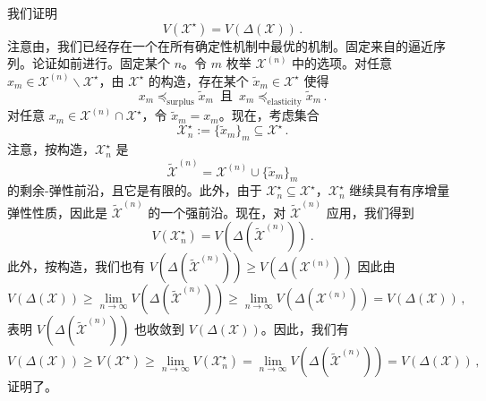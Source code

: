 \documentclass[12pt,letterpaper]{article}
\newenvironment{translation}{\color{blue}\noindent}{}
\theoremstyle{plain}
\theoremstyle{definition}
\theoremstyle{remark}
\renewcommand{\1}{\mathds{1}}
\newcommand{\X}{\mathcal{X}}
\theoremstyle{definition}
\begin{document}
\begin{translation}
我们证明
\[V(\X^\star) = V(\Delta(\X))\,.\]
注意由，我们已经存在一个在所有确定性机制中最优的机制。固定来自的逼近序列。论证如前进行。固定某个 $n$。令 $m$ 枚举 $\X^{(n)}$ 中的选项。对任意 $x_m \in \X^{(n)} \backslash \X^\star$，由 $\X^\star$ 的构造，存在某个 $\tilde{x}_m \in \X^\star$ 使得
\[x_m \preceq_{\text{surplus}} \tilde{x}_m \,\text{ 且 }\, x_m \preceq_{\text{elasticity}} \tilde{x}_m\,.\]
对任意 $x_m \in \X^{(n)} \cap \X^\star$，令 $\tilde{x}_m = x_m$。现在，考虑集合
\[\X^\star_n := \{\tilde{x}_m\}_m \subseteq \X^\star\,.\]
注意，按构造，$\X^\star_n$ 是
\[\tilde{\X}^{(n)}= \X^{(n)} \cup \{\tilde{x}_m\}_m\]
的剩余-弹性前沿，且它是有限的。此外，由于 $\X^\star_n \subseteq \X^\star$，$\X^\star_n$ 继续具有有序增量弹性性质，因此是 $\tilde{\X}^{(n)}$ 的一个强前沿。现在，对 $\tilde{\X}^{(n)}$ 应用，我们得到
\[V(\X^\star_n) = V(\Delta(\tilde{\X}^{(n)}))\,.\]
此外，按构造，我们也有
$V(\Delta(\tilde{\X}^{(n)})) \geq V(\Delta(\X^{(n)}))$
因此由
\[V(\Delta(\X)) \geq \displaystyle\lim_{n\rightarrow \infty}V(\Delta(\tilde{\X}^{(n)})) \geq \displaystyle\lim_{n\rightarrow \infty}V(\Delta(\X^{(n)})) = V(\Delta(\X))\,,\]
表明 $V(\Delta(\tilde{\X}^{(n)}))$ 也收敛到 $V(\Delta(\X))$。因此，我们有
\[ V(\Delta(\X)) \geq V(\X^\star) \geq \lim_{n\rightarrow \infty } V(\X^\star_n) = \lim_{n\rightarrow \infty }V(\Delta(\tilde{\X}^{(n)}))  =  V(\Delta(\X))\,,\]
证明了。
\end{translation}
\end{document}
